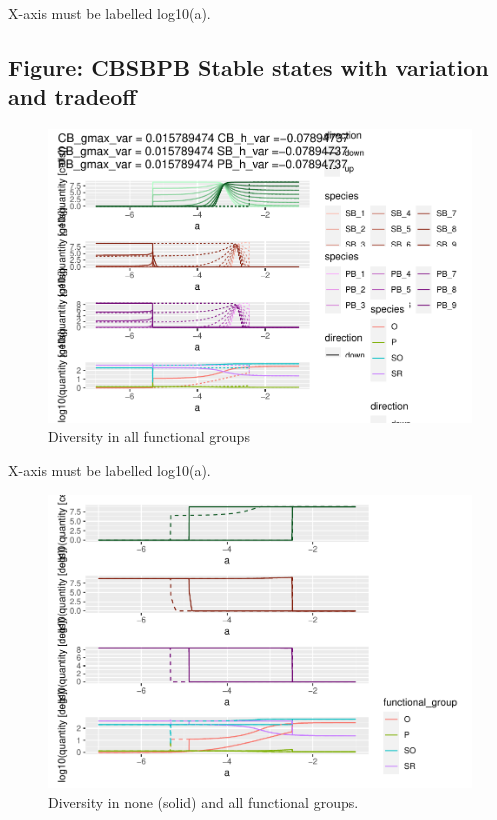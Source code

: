 \documentclass{article}
\begin{document}
X-axis must be labelled log10(a).

\hypertarget{figure-cbsbpb-stable-states-with-variation-and-tradeoff}{%
\subsection{Figure: CBSBPB Stable states with variation and
tradeoff}\label{figure-cbsbpb-stable-states-with-variation-and-tradeoff}}

\begin{figure}

{\centering \includegraphics[width=1\linewidth]{article_files/figure-latex/ss_var-1} 

}

\caption{Diversity in all functional groups}\label{fig:ss_var}
\end{figure}

X-axis must be labelled log10(a).

\begin{figure}

{\centering \includegraphics[width=1\linewidth]{article_files/figure-latex/ss_var2-1} 

}

\caption{Diversity in none (solid) and all functional groups.}\label{fig:ss_var2}
\end{figure}
\end{document}

